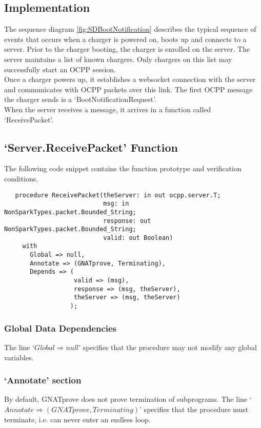 \documentclass[12pt,openany,a4paper]{book}
\begin{document}
\subsection{Implementation}
The sequence diagram \ref{fig:SDBootNotification} describes the typical sequence of events that occurs when a charger is powered on, boots up and connects to a server. Prior to the charger booting, the charger is enrolled on the server. The server maintains a list of known chargers. Only chargers on this list may successfully start an OCPP session.\\
Once a charger powers up, it establishes a websocket connection with the server and communicates with OCPP packets over this link. The first OCPP message the charger sends is a `BootNotificationRequest'.\\
When the server receives a message, it arrives in a function called `ReceivePacket'.

\pagebreak
\subsection{`Server.ReceivePacket' Function}
The following code snippet contains the function prototype and verification conditions.
\begin{verbatim}
   procedure ReceivePacket(theServer: in out ocpp.server.T;
                           msg: in NonSparkTypes.packet.Bounded_String;
                           response: out NonSparkTypes.packet.Bounded_String;
                           valid: out Boolean)
     with
       Global => null,
       Annotate => (GNATprove, Terminating),
       Depends => (
                   valid => (msg),
                   response => (msg, theServer),
                   theServer => (msg, theServer)
                  );
\end{verbatim}

\subsubsection{Global Data Dependencies}
The line `$Global \Rightarrow null$' specifies that the procedure may not modify any global variables. 
\subsubsection{`Annotate' section}
By default, GNATprove does not prove termination of subprograms. The line `$Annotate \Rightarrow (GNATprove, Terminating)$' specifies that the procedure must terminate, i.e. can never enter an endless loop. 
\end{document}
